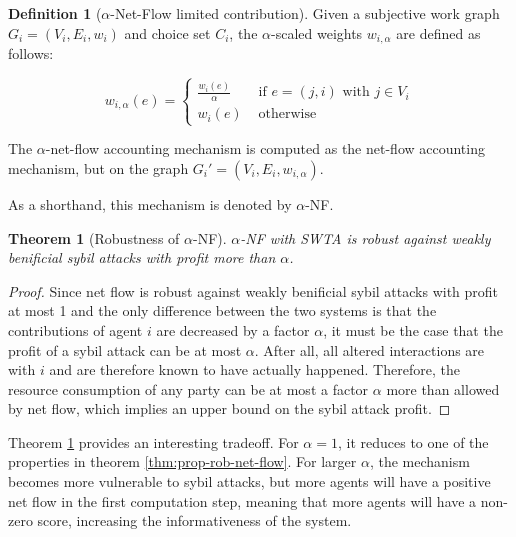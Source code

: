 \documentclass[a4paper,11pt]{book}
\newtheorem{theorem}{Theorem}
\theoremstyle{definition}
\newtheorem{definition}{Definition}
\begin{document}
\begin{definition}[$\alpha$-Net-Flow limited contribution]
    Given a subjective work graph $G_i = (V_i, E_i, w_i)$ and choice set $C_i$, the $\alpha$-scaled
    weights $w_{i,\alpha}$ are defined as follows:

    \begin{equation*}
        w_{i,\alpha}(e) = 
        \begin{cases}
            \frac{w_i(e)}{\alpha} &\mbox{ if } e = (j, i) \mbox{ with } j \in V_i \\
            w_i(e) &\mbox{ otherwise}
        \end{cases}
    \end{equation*}
    
    The $\alpha$-net-flow accounting mechanism is computed as the net-flow accounting
    mechanism, but on the graph $G_i' = (V_i, E_i, w_{i,\alpha})$.

    As a shorthand, this mechanism is denoted by $\alpha$-NF.
\end{definition}

\begin{theorem}[Robustness of $\alpha$-NF]
    $\alpha$-NF with SWTA is robust against weakly benificial sybil attacks with
    profit more than $\alpha$.
    \label{thm:sybil-anf}
\end{theorem}

\begin{proof}
    Since net flow is robust against weakly benificial sybil attacks with profit at most
    1 and the only difference between the two systems is that the contributions of
    agent $i$ are decreased by a factor $\alpha$, it must be the case that the profit
    of a sybil attack can be at most $\alpha$. After all, all altered interactions
    are with $i$ and are therefore known to have actually happened. Therefore, the
    resource consumption of any party can be at most a factor $\alpha$ more than allowed
    by net flow, which implies an upper bound on the sybil attack profit.
\end{proof}

Theorem \ref{thm:sybil-anf} provides an interesting tradeoff. For $\alpha=1$, it reduces
to one of the properties in theorem \ref{thm:prop-rob-net-flow}. For larger $\alpha$,
the mechanism becomes more vulnerable to sybil attacks, but more agents will have
a positive net flow in the first computation step, meaning that more agents will
have a non-zero score, increasing the informativeness of the system.
\end{document}
